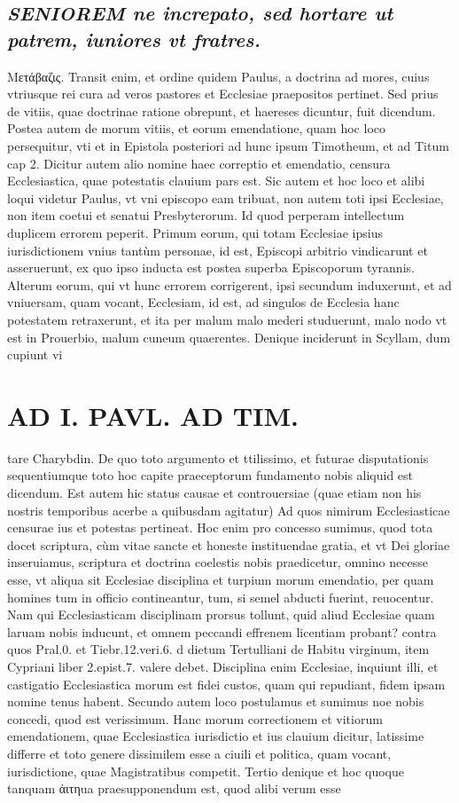 \documentclass{article}
\begin{document}
\begin{pages}
\subsection*{\textit{\huge\textbf{S}\normalsize ENIOREM ne increpato, sed hortare ut patrem, iuniores vt fratres. }}\pstart Μετάβαζις. Transit enim, et ordine quidem Paulus, a doctrina ad mores, cuius vtriusque rei cura ad veros pastores et Ecclesiae praepositos pertinet. Sed prius de vitiis, quae doctrinae ratione obrepunt, et haereses dicuntur, fuit dicendum. Postea autem de morum vitiis, et eorum emendatione, quam hoc loco persequitur, vti et in Epistola posteriori ad hunc ipsum Timotheum, et ad Titum cap 2. Dicitur autem alio nomine haec correptio et emendatio, censura Ecclesiastica, quae potestatis clauium pars est. Sic autem et hoc loco et alibi loqui videtur Paulus, vt vni episcopo eam tribuat, non autem toti ipsi Ecclesiae, non item coetui et senatui Presbyterorum. Id quod perperam intellectum duplicem errorem peperit. Primum eorum, qui totam Ecclesiae ipsius iurisdictionem vnius tantùm personae, id est, Episcopi arbitrio vindicarunt et asseruerunt, ex quo ipso inducta est postea superba Episcoporum tyrannis. Alterum eorum, qui vt hunc errorem corrigerent, ipsi secundum induxerunt, et ad vniuersam, quam vocant, Ecclesiam, id est, ad singulos de Ecclesia hanc potestatem retraxerunt, et ita per malum malo mederi studuerunt, malo nodo vt est in Prouerbio, malum cuneum quaerentes. Denique inciderunt in Scyllam, dum cupiunt vi\pend
\section*{AD I. PAVL. AD TIM. }
\marginpar{[ p.240 ]}\pstart tare Charybdin. De quo toto argumento et ttilissimo, et futurae disputationis sequentiumque toto hoc capite praeceptorum fundamento nobis aliquid est dicendum. Est autem hic status causae et controuersiae (quae etiam non his nostris temporibus acerbe a quibusdam agitatur) Ad quos nimirum Ecclesiasticae censurae ius et potestas pertineat. Hoc enim pro concesso sumimus, quod tota docet scriptura, cùm vitae sancte et honeste instituendae gratia, et vt Dei gloriae inseruiamus, scriptura et doctrina coelestis nobis praedicetur, omnino necesse esse, vt aliqua sit Ecclesiae disciplina et turpium morum emendatio, per quam homines tum in officio contineantur, tum, si semel abducti fuerint, reuocentur. Nam qui Ecclesiasticam disciplinam prorsus tollunt, quid aliud Ecclesiae quam laruam nobis inducunt, et omnem peccandi effrenem licentiam probant? contra quos Pral.0. et Tiebr.12.veri.6. d dietum Tertulliani de Habitu virginum, item Cypriani liber  2.epist.7. valere debet. Disciplina enim Ecclesiae, inquiunt illi, et castigatio Ecclesiastica morum est fidei custos, quam qui repudiant, fidem ipsam nomine tenus habent. Secundo autem loco postulamus et sumimus  \pend\pstart noe nobis concedi, quod est verissimum. Hanc morum correctionem et vitiorum emendationem, quae Ecclesiastica iurisdictio et ius clauium dicitur, latissime differre et toto genere dissimilem esse a ciuili et politica, quam vocant, iurisdictione, quae Magistratibus competit.  \pend\pstart Tertio denique et hoc quoque tanquam ἀιτηua praesupponendum est, quod alibi verum esse  \pend

\end{pages}
\end{document}
